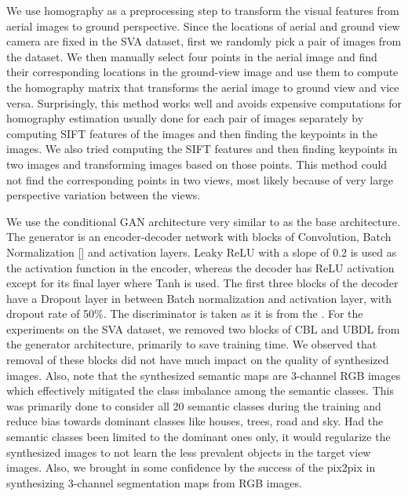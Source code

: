\documentclass[times,twocolumn,final,authoryear]{elsarticle_modified}
\begin{document}
We use homography as a preprocessing step to transform the visual features from aerial images to ground perspective. Since the locations of aerial and ground view camera are fixed in the SVA dataset, first we randomly pick a pair of images from the dataset. We then manually select four points in the aerial image and find their corresponding locations in the ground-view image and use them to compute the homography matrix that transforms the aerial image to ground view and vice versa. Surprisingly, this method works well and avoids expensive computations for homography estimation usually done for each pair of images separately by computing SIFT features of the images and then finding the keypoints in the images. We also tried computing the SIFT features and then finding keypoints in two images and transforming images based on those points. This method could not find the corresponding points in two views, most likely because of very large perspective variation between the views.

We use the conditional GAN architecture very similar to \cite{pix2pix2017} as the base architecture. The generator is an encoder-decoder network with blocks of Convolution, Batch Normalization [\cite{Ioffe:2015:BNA:3045118.3045167}] and activation layers. Leaky ReLU with a slope of 0.2 is used as the activation function in the encoder, whereas the decoder has ReLU activation except for its final layer where Tanh is used. The first three blocks of the decoder have a Dropout layer in between Batch normalization and activation layer, with dropout rate of 50\%. The discriminator is taken as it is from the \cite{pix2pix2017}. For the experiments on the SVA dataset, we removed two blocks of CBL and UBDL from the generator architecture, primarily to save training time. We observed that removal of these blocks did not have much impact on the quality of synthesized images. Also, note that the synthesized semantic maps are 3-channel RGB images which effectively mitigated the class imbalance among the semantic classes. This was primarily done to consider all 20 semantic classes during the training and reduce bias towards dominant classes like houses, trees, road and sky. Had the semantic classes been limited to the dominant ones only, it would regularize the synthesized images to not learn the less prevalent objects in the target view images. Also, we brought in some confidence by the success of the pix2pix in synthesizing 3-channel segmentation maps from RGB images.
\end{document}
